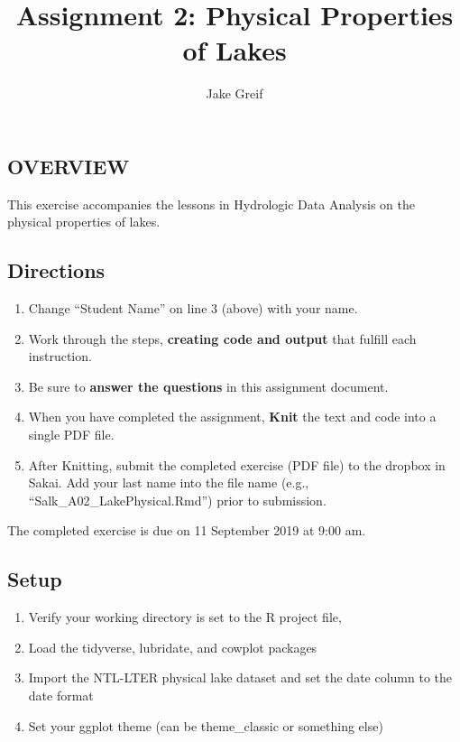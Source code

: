 \documentclass[]{article}
\title{Assignment 2: Physical Properties of Lakes}
\author{Jake Greif}
\date{}
\providecommand{\tightlist}{%
  \setlength{\itemsep}{0pt}\setlength{\parskip}{0pt}}
\begin{document}
\maketitle

\hypertarget{overview}{%
\subsection{OVERVIEW}\label{overview}}

This exercise accompanies the lessons in Hydrologic Data Analysis on the
physical properties of lakes.

\hypertarget{directions}{%
\subsection{Directions}\label{directions}}

\begin{enumerate}
\def\labelenumi{\arabic{enumi}.}
\tightlist
\item
  Change ``Student Name'' on line 3 (above) with your name.
\item
  Work through the steps, \textbf{creating code and output} that fulfill
  each instruction.
\item
  Be sure to \textbf{answer the questions} in this assignment document.
\item
  When you have completed the assignment, \textbf{Knit} the text and
  code into a single PDF file.
\item
  After Knitting, submit the completed exercise (PDF file) to the
  dropbox in Sakai. Add your last name into the file name (e.g.,
  ``Salk\_A02\_LakePhysical.Rmd'') prior to submission.
\end{enumerate}

The completed exercise is due on 11 September 2019 at 9:00 am.

\hypertarget{setup}{%
\subsection{Setup}\label{setup}}

\begin{enumerate}
\def\labelenumi{\arabic{enumi}.}
\tightlist
\item
  Verify your working directory is set to the R project file,
\item
  Load the tidyverse, lubridate, and cowplot packages
\item
  Import the NTL-LTER physical lake dataset and set the date column to
  the date format
\item
  Set your ggplot theme (can be theme\_classic or something else)
\end{enumerate}
\end{document}
